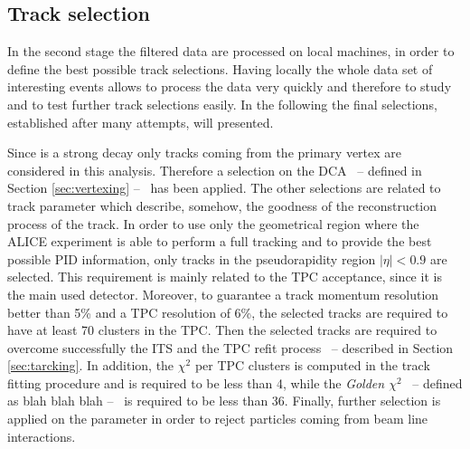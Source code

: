 %
\subsection{Track selection} \label{sec:track_sel_crit}

In the second stage the filtered data are processed on local machines, in order to define
the best possible track selections.
Having locally the whole data set of interesting events allows to process the data very 
quickly and therefore to study and to test further track selections easily.
In the following the final selections, established after many attempts, will presented.

Since \dstdecay is a strong decay only tracks coming from the primary vertex are 
considered in this analysis. Therefore a selection on the DCA \ -- defined in Section
\ref{sec:vertexing} -- \ has been applied. 
The other selections are related to track parameter which describe, somehow, the goodness of the
reconstruction process of the track. 
In order to use only the geometrical region where the ALICE experiment is able to perform a full
tracking and to provide the best possible PID information, only tracks in the pseudorapidity 
region $|\eta| < 0.9 $ are selected. This requirement is mainly related to the TPC acceptance,
since it is the main used detector. 
Moreover, to guarantee a track momentum resolution better than 5\% and a TPC \dedx resolution of
6\%, the selected tracks are required to have at least 70 clusters in the TPC.
Then the selected tracks are required to overcome successfully the ITS and the TPC refit process
\ -- described in Section \ref{sec:tarcking}.
In addition, the $\chi^{2}$ per TPC clusters is computed in the track fitting procedure and is
required to be less than 4, while the \textit{Golden $\chi^{2}$} \ -- defined as blah blah blah -- 
\ is required to be less than 36.
Finally, further selection is applied on the  parameter in order to reject
particles coming from beam line interactions.

